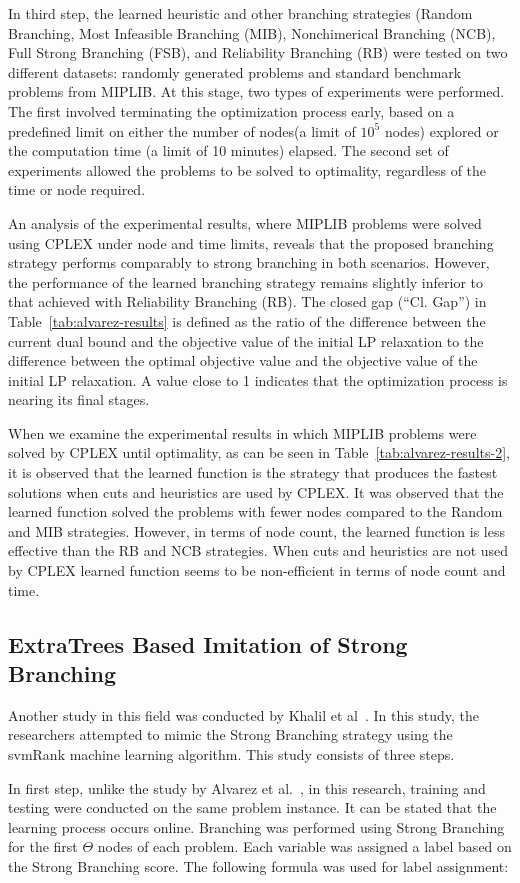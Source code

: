 In third step, the learned heuristic and other branching strategies (Random Branching, Most Infeasible Branching (MIB), Nonchimerical Branching (NCB), Full Strong Branching (FSB), and Reliability Branching (RB) were tested on two different datasets: randomly generated problems and standard benchmark problems from MIPLIB.
At this stage, two types of experiments were performed.
The first involved terminating the optimization process early, based on a predefined limit on either the number of nodes(a limit of $10^5$ nodes) explored or the computation time (a limit of 10 minutes) elapsed.
The second set of experiments allowed the problems to be solved to optimality, regardless of the time or node required.


An analysis of the experimental results, where MIPLIB problems were solved using CPLEX under node and time limits, reveals that the proposed branching strategy performs comparably to strong branching in both scenarios.
However, the performance of the learned branching strategy remains slightly inferior to that achieved with Reliability Branching (RB).
The closed gap (“Cl. Gap”) in Table~\ref{tab:alvarez-results} is defined as the ratio of the difference between the current dual bound and the objective value of the initial LP relaxation to the difference between the optimal objective value and the objective value of the initial LP relaxation.
A value close to 1 indicates that the optimization process is nearing its final stages.




When we examine the experimental results in which MIPLIB problems were solved by CPLEX until optimality, as can be seen in Table~\ref{tab:alvarez-results-2}, it is observed that the learned function is the strategy that produces the fastest solutions when cuts and heuristics are used by CPLEX.
It was observed that the learned function solved the problems with fewer nodes compared to the Random and MIB strategies.
However, in terms of node count, the learned function is less effective than the RB and NCB strategies.
When cuts and heuristics are not used by CPLEX learned function seems to be non-efficient in terms of node count and time.




\subsection{ExtraTrees Based Imitation of Strong Branching}
Another study in this field was conducted by Khalil et al~\cite{khalilLearningBranchMixed2016}.
In this study, the researchers attempted to mimic the Strong Branching strategy using the svmRank machine learning algorithm.
This study consists of three steps.


In first step, unlike the study by Alvarez et al.~\cite{alvarezMachineLearningBasedApproximation2017}, in this research, training and testing were conducted on the same problem instance.
It can be stated that the learning process occurs online.
Branching was performed using Strong Branching for the first $\Theta$ nodes of each problem.
Each variable was assigned a label based on the Strong Branching score.
The following formula was used for label assignment: